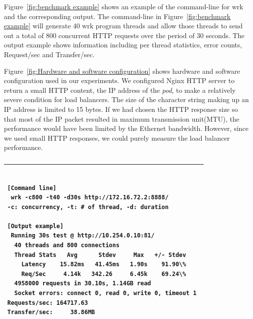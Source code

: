 Figure~\ref{fig:benchmark example} shows an example of the command-line for wrk and the corresponding output.
The command-line in Figure~\ref{fig:benchmark example} will generate 40 wrk program threads 
and allow those threads to send out a total of 800 concurrent HTTP requests over the period of 30 seconds.
The output example shows information including per thread statistics, error counts, Request/sec and Transfer/sec.

Figure~\ref{fig:Hardware and software configuration} shows hardware and software configuration used in our experiments.
We configured Nginx HTTP server to return a small HTTP content, 
the IP address of the {\em pod}, to make a relatively severe condition for load balancers. 
The size of the character string making up an IP address is limited to 15 bytes.
If we had chosen the HTTP response size so that most of the IP packet resulted in maximum transmission unit(MTU), 
the performance would have been limited by the Ethernet bandwidth.
However, since we used small HTTP responses, we could purely measure the load balancer performance.


\begin{figure}[t]
  \centering
  \caption{}
  \label{fig:lb_single_schem}
\end{figure}

\begin{table}[]
  \centering
  \begin{tabular}{l}
    \hline
    \begin{minipage}{12cm}
      \begin{verbatim}

[Command line] 
 wrk -c800 -t40 -d30s http://172.16.72.2:8888/ 
-c: concurrency, -t: # of thread, -d: duration 

[Output example] 
 Running 30s test @ http://10.254.0.10:81/ 
  40 threads and 800 connections 
  Thread Stats   Avg      Stdev     Max   +/- Stdev 
    Latency    15.82ms   41.45ms   1.90s    91.90\% 
    Req/Sec     4.14k   342.26     6.45k    69.24\% 
  4958000 requests in 30.10s, 1.14GB read 
  Socket errors: connect 0, read 0, write 0, timeout 1 
Requests/sec: 164717.63 
Transfer/sec:     38.86MB 
      \end{verbatim}
    \end{minipage}
   \\ \hline
  \end{tabular}
  \caption{}
  \label{tab:bench_example}
\end{table}


